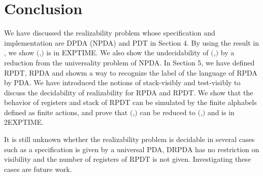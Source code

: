 \section{Conclusion}
We have discussed the realizability problem
whose specification and implementation are
DPDA (NPDA) and PDT in Section 4.
By using the result in \cite{Wa96},
we show \Real$($\DPDA,\PDT$)$ is in EXPTIME.
We also show the undecidability of \Real$($\NPDA,\PDT$)$
by a reduction from the universality problem of NPDA.
In Section 5, we have defined RPDT, RPDA and
showm a way to recognize the label of the language of RPDA by PDA.
We have introduced the notions of stack-visibly \cite{AM04} and
test-visibly to discuss the decidability of realizability
for RPDA and RPDT.
We show that the behavior of registers and stack of RPDT
can be simulated by the finite alphabels defined as finite actions,
and prove that \Real$($\DRPDAv,\RPDTk$)$ can be reduced to \Real$($\DPDA,\PDT$)$ and is in 2EXPTIME.

It is still unknown whether the realizability problem is decidable
in several cases such as
a specification is given by a universal PDA,
DRPDA has no restriction on visibility and
the number of registers of RPDT is not given.
Investigating these cases are future work.
